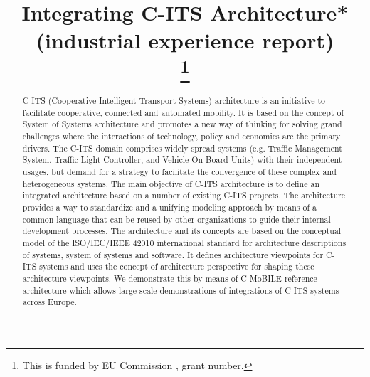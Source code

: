 \documentclass[conference]{IEEEtran}
\begin{document}
\title{Integrating C-ITS Architecture* (industrial experience report)\\
\thanks{This is funded by EU Commission , grant number.}
}

\author{
\and
{}
\and
{}
}

\maketitle

\begin{abstract}
C-ITS (Cooperative Intelligent Transport Systems) architecture  is an initiative to facilitate cooperative, connected and automated mobility. It is based on the concept of System of Systems architecture and promotes a new way of thinking for solving grand challenges where the interactions of technology, policy and economics are the primary drivers. The C-ITS domain comprises widely spread systems (e.g. Traffic Management System, Traffic Light Controller, and Vehicle On-Board Units) with their independent usages, but demand for a strategy to facilitate the convergence of these complex and heterogeneous systems. The main objective of C-ITS architecture is to define an integrated architecture based on a number of existing C-ITS projects. The architecture provides a way to standardize and a unifying modeling approach by means of a common language that can be reused by other organizations to guide their internal development processes. The architecture and its concepts are based on the conceptual model of the ISO/IEC/IEEE 42010\cite{iso42010} international standard for architecture descriptions of systems, system of systems and software. It defines architecture viewpoints for C-ITS systems and uses the concept of architecture perspective for shaping these architecture viewpoints. We demonstrate this by means of C-MoBILE reference architecture which allows large scale demonstrations of integrations of C-ITS systems across Europe.
\end{abstract}
\end{document}
